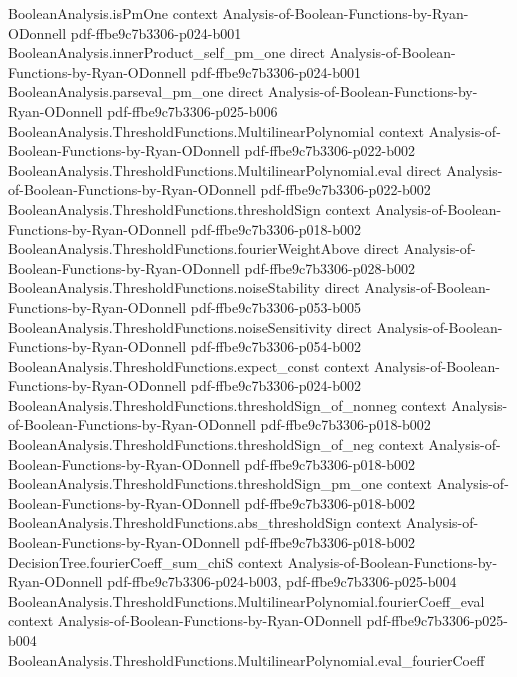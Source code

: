 \begin{lemma}
\proofstep
  {BooleanAnalysis.isPmOne}
  {context}
  {Analysis-of-Boolean-Functions-by-Ryan-ODonnell}
  {pdf-ffbe9c7b3306-p024-b001}
\proofstep
  {BooleanAnalysis.innerProduct_self_pm_one}
  {direct}
  {Analysis-of-Boolean-Functions-by-Ryan-ODonnell}
  {pdf-ffbe9c7b3306-p024-b001}
\proofstep
  {BooleanAnalysis.parseval_pm_one}
  {direct}
  {Analysis-of-Boolean-Functions-by-Ryan-ODonnell}
  {pdf-ffbe9c7b3306-p025-b006}
\proofstep
  {BooleanAnalysis.ThresholdFunctions.MultilinearPolynomial}
  {context}
  {Analysis-of-Boolean-Functions-by-Ryan-ODonnell}
  {pdf-ffbe9c7b3306-p022-b002}
\proofstep
  {BooleanAnalysis.ThresholdFunctions.MultilinearPolynomial.eval}
  {direct}
  {Analysis-of-Boolean-Functions-by-Ryan-ODonnell}
  {pdf-ffbe9c7b3306-p022-b002}
\proofstep
  {BooleanAnalysis.ThresholdFunctions.thresholdSign}
  {context}
  {Analysis-of-Boolean-Functions-by-Ryan-ODonnell}
  {pdf-ffbe9c7b3306-p018-b002}
\proofstep
  {BooleanAnalysis.ThresholdFunctions.fourierWeightAbove}
  {direct}
  {Analysis-of-Boolean-Functions-by-Ryan-ODonnell}
  {pdf-ffbe9c7b3306-p028-b002}
\proofstep
  {BooleanAnalysis.ThresholdFunctions.noiseStability}
  {direct}
  {Analysis-of-Boolean-Functions-by-Ryan-ODonnell}
  {pdf-ffbe9c7b3306-p053-b005}
\proofstep
  {BooleanAnalysis.ThresholdFunctions.noiseSensitivity}
  {direct}
  {Analysis-of-Boolean-Functions-by-Ryan-ODonnell}
  {pdf-ffbe9c7b3306-p054-b002}
\proofstep
  {BooleanAnalysis.ThresholdFunctions.expect_const}
  {context}
  {Analysis-of-Boolean-Functions-by-Ryan-ODonnell}
  {pdf-ffbe9c7b3306-p024-b002}
\proofstep
  {BooleanAnalysis.ThresholdFunctions.thresholdSign_of_nonneg}
  {context}
  {Analysis-of-Boolean-Functions-by-Ryan-ODonnell}
  {pdf-ffbe9c7b3306-p018-b002}
\proofstep
  {BooleanAnalysis.ThresholdFunctions.thresholdSign_of_neg}
  {context}
  {Analysis-of-Boolean-Functions-by-Ryan-ODonnell}
  {pdf-ffbe9c7b3306-p018-b002}
\proofstep
  {BooleanAnalysis.ThresholdFunctions.thresholdSign_pm_one}
  {context}
  {Analysis-of-Boolean-Functions-by-Ryan-ODonnell}
  {pdf-ffbe9c7b3306-p018-b002}
\proofstep
  {BooleanAnalysis.ThresholdFunctions.abs_thresholdSign}
  {context}
  {Analysis-of-Boolean-Functions-by-Ryan-ODonnell}
  {pdf-ffbe9c7b3306-p018-b002}
\proofstep
  {DecisionTree.fourierCoeff_sum_chiS}
  {context}
  {Analysis-of-Boolean-Functions-by-Ryan-ODonnell}
  {pdf-ffbe9c7b3306-p024-b003,
    pdf-ffbe9c7b3306-p025-b004}
\proofstep
  {BooleanAnalysis.ThresholdFunctions.MultilinearPolynomial.fourierCoeff_eval}
  {context}
  {Analysis-of-Boolean-Functions-by-Ryan-ODonnell}
  {pdf-ffbe9c7b3306-p025-b004}
\proofstep
  {BooleanAnalysis.ThresholdFunctions.MultilinearPolynomial.eval_fourierCoeff}

\end{lemma}
